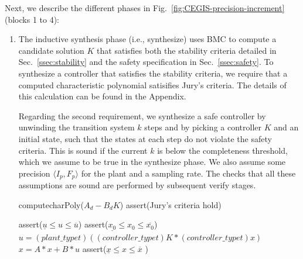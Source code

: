 \documentclass[runningheads,a4paper]{llncs}
\begin{document}
\medskip

Next, we describe the different phases in Fig.~\ref{fig:CEGIS-precision-increment}
(blocks 1 to 4):

\begin{enumerate}
\item The inductive synthesis phase (i.e., {\sc synthesize}) uses BMC to
compute a candidate solution $K$
that satisfies both the stability criteria detailed in 
Sec.~\ref{ssec:stability} and the safety specification in Sec.~\ref{ssec:safety}.
To synthesize a controller that satisfies the stability criteria, we require that
a computed characteristic polynomial satisifies Jury's criteria. The details of this
calculation can be found in the Appendix.

Regarding the second requirement, we synthesize a safe controller by unwinding the transition system
$k$ steps and by picking a controller $K$ and an initial state, such that the states at each step do
not violate the safety criteria. This is sound if the current $k$ is below the
completeness threshold, which we assume to be true in the {\sc synthesize} phase.
We also assume some
precision $\langle I_p,F_p\rangle$ for the plant and a sampling rate.  The
checks that all these assumptions are sound are performed by subsequent
{\sc verify} stages.

\begin{algorithm}[]
\begin{algorithmic}[1]
  \State computecharPoly($A_d - B_dK$)
  \State assert(Jury's criteria hold)
\EndFunction
\end{algorithmic}
\label{alg:stabilitycheck}
\end{algorithm}


\begin{algorithm}[]
\begin{algorithmic}[1]
	\State assert($ \underline{u}  \leq u \leq \overline{u}$)
  \State assert($ \underline{x_0}  \leq x_0 \leq \overline{x_0}$)
		\State $u = (plant\_typet)((controller\_typet)K * (controller\_typet) x)$
		\State $x = A * x + B * u$
		\State assert($\underline{x} \leq x \leq \overline{x}$ )
  	\EndWhile
\EndFunction
\end{algorithmic}
\label{alg:safetycheck}
\end{algorithm}


\end{enumerate}
\end{document}
